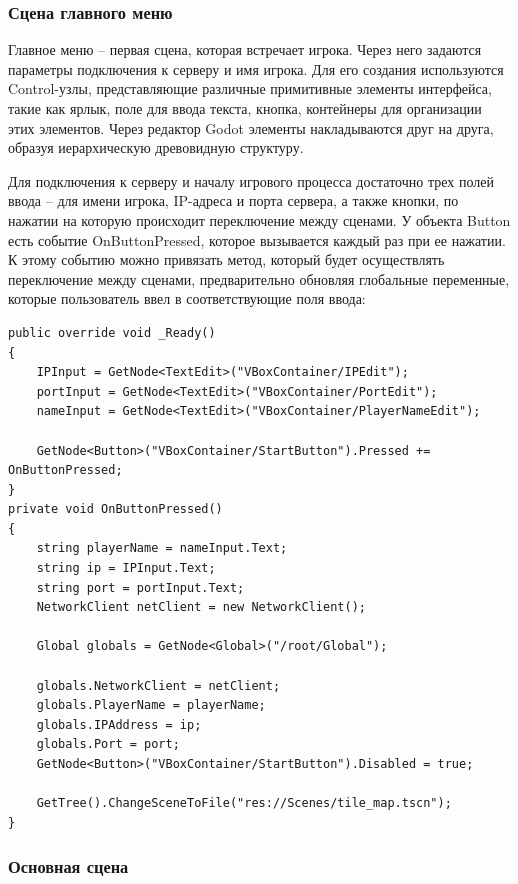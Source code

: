         \subsubsection{Сцена главного меню}

        Главное меню -- первая сцена, которая встречает игрока. Через него задаются параметры подключения к серверу и имя игрока. Для его создания используются Control-узлы, представляющие
        различные примитивные элементы интерфейса, такие как ярлык, поле для ввода текста, кнопка, контейнеры для организации этих элементов. Через редактор Godot элементы накладываются друг на
        друга, образуя иерархическую древовидную структуру.

        Для подключения к серверу и началу игрового процесса достаточно трех полей ввода -- для имени игрока, IP-адреса и порта сервера, а также кнопки, по нажатии на которую происходит
        переключение между сценами. У объекта Button есть событие OnButtonPressed, которое вызывается каждый раз при ее нажатии. К этому событию можно привязать метод, который будет
        осуществлять переключение между сценами, предварительно обновляя глобальные переменные, которые пользователь ввел в соответствующие поля ввода:

        \begin{lstlisting}[caption=Реализация логики главного меню]
public override void _Ready()
{
    IPInput = GetNode<TextEdit>("VBoxContainer/IPEdit");
    portInput = GetNode<TextEdit>("VBoxContainer/PortEdit");
    nameInput = GetNode<TextEdit>("VBoxContainer/PlayerNameEdit");

    GetNode<Button>("VBoxContainer/StartButton").Pressed += OnButtonPressed;
}
private void OnButtonPressed()
{
    string playerName = nameInput.Text;
    string ip = IPInput.Text;
    string port = portInput.Text;
    NetworkClient netClient = new NetworkClient();

    Global globals = GetNode<Global>("/root/Global");

    globals.NetworkClient = netClient;
    globals.PlayerName = playerName;
    globals.IPAddress = ip;
    globals.Port = port;
    GetNode<Button>("VBoxContainer/StartButton").Disabled = true;

    GetTree().ChangeSceneToFile("res://Scenes/tile_map.tscn");
}
        \end{lstlisting}

        \subsubsection{Основная сцена}

